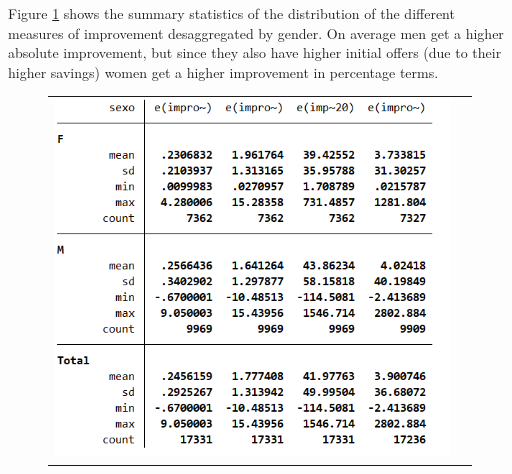\documentclass[12pt]{article}
\begin{document}
Figure \ref{fig:aux} shows the summary statistics of the distribution of the different measures of improvement desaggregated by gender. On average men get a higher absolute improvement, but since they also have higher initial offers (due to their higher savings) women get a higher improvement in percentage terms.
\begin{figure}[H]
\caption{}
\label{fig:aux}
\centering{}%
\begin{tabular}{cc}
\includegraphics[scale=0.7]{Tables/IE3_offer_improvement_bygender.png}
\end{tabular}
\end{figure}
\end{document}
